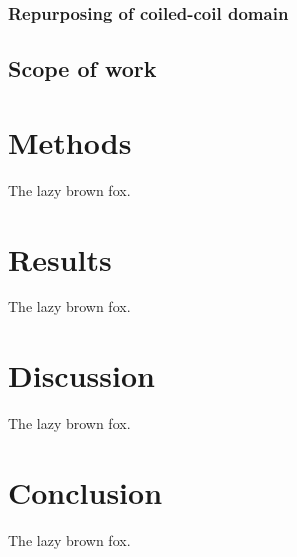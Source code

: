 \subsubsection{Repurposing of coiled-coil domain}

\subsection{Scope of work}

\section{Methods}
The lazy brown fox.

\section{Results}
The lazy brown fox.

\section{Discussion}
The lazy brown fox.

\section{Conclusion}
The lazy brown fox.
